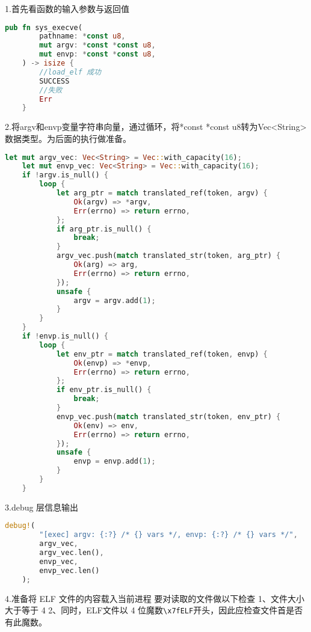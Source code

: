 1.首先看函数的输入参数与返回值
\begin{lstlisting}[language={Rust}, 
    caption={函数的输入参数与返回值}]
    pub fn sys_execve(
        pathname: *const u8,
        mut argv: *const *const u8,
        mut envp: *const *const u8,
    ) -> isize {
        //load_elf 成功
        SUCCESS
        //失败
        Err
    }
\end{lstlisting}
2.将argv和envp变量字符串向量，通过循环，将*const *const u8转为Vec<String>数据类型。为后面的执行做准备。
\begin{lstlisting}[language={Rust}, 
    caption={类型转换}]
    let mut argv_vec: Vec<String> = Vec::with_capacity(16);
    let mut envp_vec: Vec<String> = Vec::with_capacity(16);
    if !argv.is_null() {
        loop {
            let arg_ptr = match translated_ref(token, argv) {
                Ok(argv) => *argv,
                Err(errno) => return errno,
            };
            if arg_ptr.is_null() {
                break;
            }
            argv_vec.push(match translated_str(token, arg_ptr) {
                Ok(arg) => arg,
                Err(errno) => return errno,
            });
            unsafe {
                argv = argv.add(1);
            }
        }
    }
    if !envp.is_null() {
        loop {
            let env_ptr = match translated_ref(token, envp) {
                Ok(envp) => *envp,
                Err(errno) => return errno,
            };
            if env_ptr.is_null() {
                break;
            }
            envp_vec.push(match translated_str(token, env_ptr) {
                Ok(env) => env,
                Err(errno) => return errno,
            });
            unsafe {
                envp = envp.add(1);
            }
        }
    }


\end{lstlisting}
3.debug 层信息输出
\begin{lstlisting}[language={Rust}, 
    caption={debug信息}]
    debug!(
        "[exec] argv: {:?} /* {} vars */, envp: {:?} /* {} vars */",
        argv_vec,
        argv_vec.len(),
        envp_vec,
        envp_vec.len()
    );
  \end{lstlisting}
4.准备将 ELF 文件的内容载入当前进程
要对读取的文件做以下检查
    1、文件大小大于等于 4
    2、同时，ELF文件以 4 位魔数\lstinline`\x7fELF`开头，因此应检查文件首是否有此魔数。
